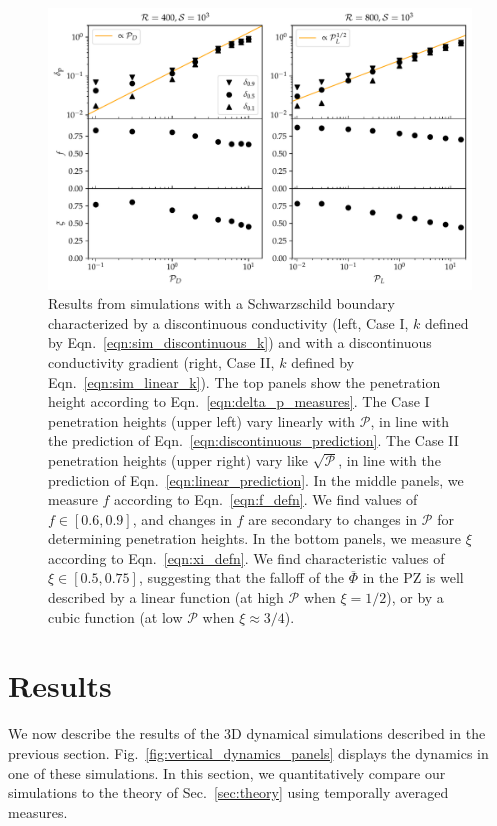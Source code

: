 \documentclass[twocolumn]{aastex631}
\newcommand{\mP}{\ensuremath{\mathcal{P}}}
\renewcommand{\bar}[1]{\overline{#1}}
\begin{document}
\begin{figure}[t]
\centering
\includegraphics[width=\textwidth]{parameters_vs_p.pdf}
\caption{
Results from simulations with a Schwarzschild boundary characterized by a discontinuous conductivity (left, Case I, $k$ defined by Eqn.~\ref{eqn:sim_discontinuous_k}) and with a discontinuous conductivity gradient (right, Case II, $k$ defined by Eqn.~\ref{eqn:sim_linear_k}).
The top panels show the penetration height according to Eqn.~\ref{eqn:delta_p_measures}.
The Case I penetration heights (upper left) vary linearly with $\mP$, in line with the prediction of Eqn.~\ref{eqn:discontinuous_prediction}.
The Case II penetration heights (upper right) vary like $\sqrt{\mP}$, in line with the prediction of Eqn.~\ref{eqn:linear_prediction}.
In the middle panels, we measure $f$ according to Eqn.~\ref{eqn:f_defn}.
We find values of $f \in [0.6, 0.9]$, and changes in $f$ are secondary to changes in $\mP$ for determining penetration heights.
In the bottom panels, we measure $\xi$ according to Eqn.~\ref{eqn:xi_defn}.
We find characteristic values of $\xi \in [0.5, 0.75]$, suggesting that the falloff of the $\bar{\Phi}$ in the PZ is well described by a linear function (at high $\mP$ when $\xi = 1/2$), or by a cubic function (at low $\mP$ when $\xi \approx 3/4$).
\label{fig:parameters_vs_p}
}
\end{figure}





\section{Results}
\label{sec:results}

We now describe the results of the 3D dynamical simulations described in the previous section.
Fig.~\ref{fig:vertical_dynamics_panels} displays the dynamics in one of these simulations.
In this section, we quantitatively compare our simulations to the theory of Sec.~\ref{sec:theory} using temporally averaged measures.
\end{document}
